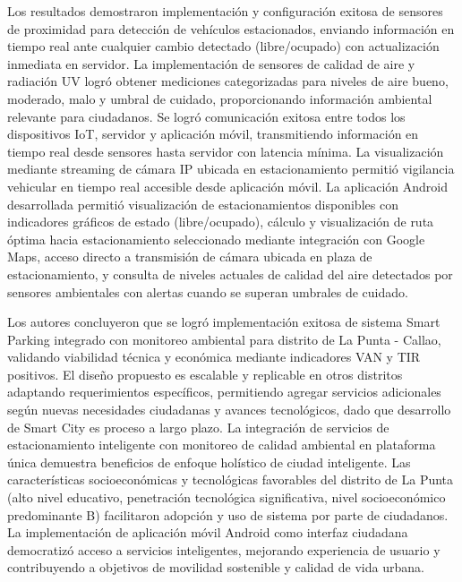 \documentclass[12pt,a4paper]{article}
\begin{document}
Los resultados demostraron implementación y configuración exitosa de sensores de proximidad para detección de vehículos estacionados, enviando información en tiempo real ante cualquier cambio detectado (libre/ocupado) con actualización inmediata en servidor. La implementación de sensores de calidad de aire y radiación UV logró obtener mediciones categorizadas para niveles de aire bueno, moderado, malo y umbral de cuidado, proporcionando información ambiental relevante para ciudadanos. Se logró comunicación exitosa entre todos los dispositivos IoT, servidor y aplicación móvil, transmitiendo información en tiempo real desde sensores hasta servidor con latencia mínima. La visualización mediante streaming de cámara IP ubicada en estacionamiento permitió vigilancia vehicular en tiempo real accesible desde aplicación móvil. La aplicación Android desarrollada permitió visualización de estacionamientos disponibles con indicadores gráficos de estado (libre/ocupado), cálculo y visualización de ruta óptima hacia estacionamiento seleccionado mediante integración con Google Maps, acceso directo a transmisión de cámara ubicada en plaza de estacionamiento, y consulta de niveles actuales de calidad del aire detectados por sensores ambientales con alertas cuando se superan umbrales de cuidado.

Los autores concluyeron que se logró implementación exitosa de sistema Smart Parking integrado con monitoreo ambiental para distrito de La Punta - Callao, validando viabilidad técnica y económica mediante indicadores VAN y TIR positivos. El diseño propuesto es escalable y replicable en otros distritos adaptando requerimientos específicos, permitiendo agregar servicios adicionales según nuevas necesidades ciudadanas y avances tecnológicos, dado que desarrollo de Smart City es proceso a largo plazo. La integración de servicios de estacionamiento inteligente con monitoreo de calidad ambiental en plataforma única demuestra beneficios de enfoque holístico de ciudad inteligente. Las características socioeconómicas y tecnológicas favorables del distrito de La Punta (alto nivel educativo, penetración tecnológica significativa, nivel socioeconómico predominante B) facilitaron adopción y uso de sistema por parte de ciudadanos. La implementación de aplicación móvil Android como interfaz ciudadana democratizó acceso a servicios inteligentes, mejorando experiencia de usuario y contribuyendo a objetivos de movilidad sostenible y calidad de vida urbana.
\end{document}
